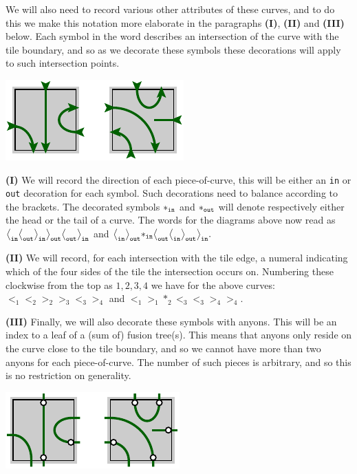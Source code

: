 We will also need to record
various other attributes of these curves,
and to do this we make this notation more elaborate
in the paragraphs {\bf (I)}, {\bf(II)} and {\bf(III)} below.
Each symbol in the word describes an intersection of
the curve with the tile boundary,
and so as we decorate these symbols these decorations will
apply to such intersection points.

\begin{center}
\includegraphics[]{pic-cells-1.pdf}
\end{center}

{\bf (I)} We will record the direction of each piece-of-curve,
this will be either an {\tt in} or {\tt out} decoration for each symbol.
Such decorations need to balance according to the brackets.
The decorated symbols $*_{\mathrm{\tt in}}$ and 
$*_{\mathrm{\tt out}}$ 
will denote respectively either
the head or the tail of a curve.
The words for the diagrams above now read as
$ \bigl<_{\mathrm{\tt in}}\bigl<_{\mathrm{\tt out}}\bigr>_{\mathrm{\tt in}}
    \bigr>_{\mathrm{\tt out}}\bigl<_{\mathrm{\tt out}}\bigr>_{\mathrm{\tt in}}$
and
$ \bigl<_{\mathrm{\tt in}}\bigl>_{\mathrm{\tt out}}*_{\mathrm{\tt in}}
    \bigr<_{\mathrm{\tt out}}
    \bigr<_{\mathrm{\tt in}}\bigl>_{\mathrm{\tt out}}\bigr>_{\mathrm{\tt in}}.
$

\vskip 10pt
{\bf (II)} We will record,
for each intersection with the tile edge, 
a numeral indicating which of the four
sides of the tile the
intersection occurs on.
Numbering these clockwise from the top as $1, 2, 3, 4$ we have for the above curves: 
$\bigl<_1\bigl<_2\bigr>_2\bigr>_3\bigl<_3\bigr>_4$ 
and $\bigl<_1\bigr>_1*_2\bigl<_3\bigl<_3\bigr>_4\bigr>_4.$

\vskip 10pt
{\bf (III)} Finally, we will also decorate these symbols with anyons.
This will be an index to a leaf of a (sum of) fusion tree(s).
This means that anyons only reside on the curve close
to the tile boundary,
and so we cannot have more than two anyons
for each piece-of-curve. 
The number of such pieces is arbitrary, and so this
is no restriction on generality.

\begin{center}
\includegraphics[]{pic-cells-2.pdf}
\end{center}

